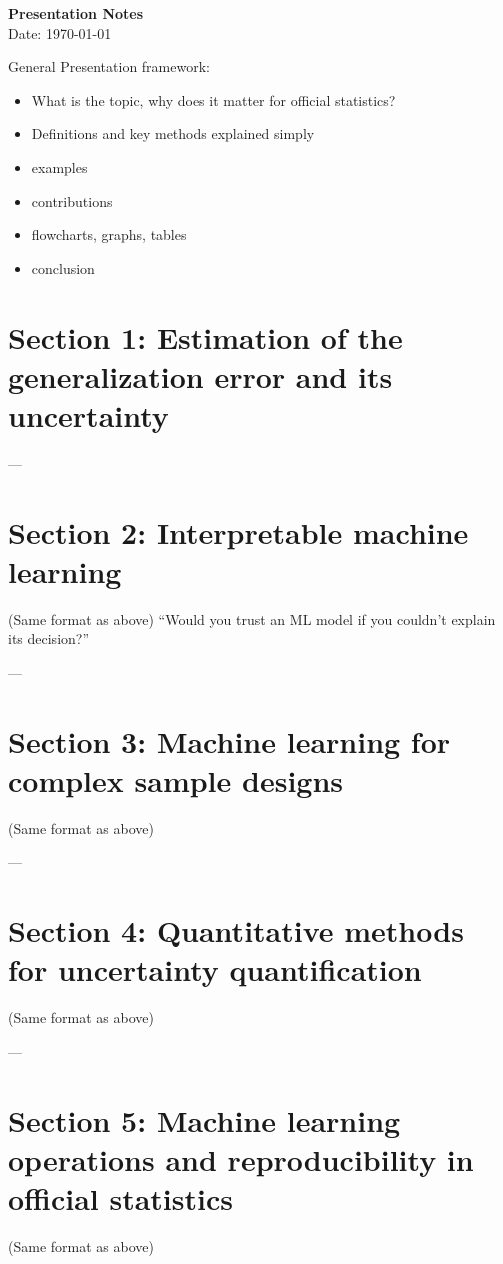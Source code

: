 \documentclass[a4paper,12pt]{article}
\begin{document}
\begin{center}
    {\LARGE \textbf{Presentation Notes}} \\
    \vspace{0.2cm}
    {\small Date: \today}
\end{center}

General Presentation framework:
\begin{itemize}
    \item What is the topic, why does it matter for official statistics?
    \item Definitions and key methods explained simply
    \item examples
    \item contributions
    \item flowcharts, graphs, tables
    \item conclusion
\end{itemize}
\section{Section 1: Estimation of the generalization error and its uncertainty}

---

\section{Section 2:  Interpretable machine learning }
(Same format as above)
“Would you trust an ML model if you couldn’t explain its decision?”

---

\section{Section 3:  Machine learning for complex sample designs }
(Same format as above)

---

\section{Section 4: Quantitative methods for uncertainty quantification}
(Same format as above)

---

\section{Section 5: Machine learning operations and reproducibility in official statistics}
(Same format as above)
\end{document}
